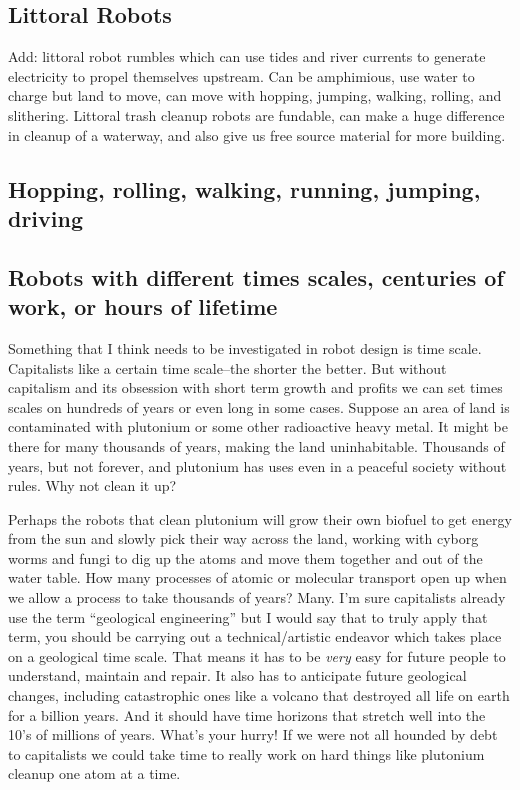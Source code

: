 \subsection{Littoral Robots}\label{littoral-robots}

Add: littoral robot rumbles which can use tides and river currents to
generate electricity to propel themselves upstream. Can be amphimious,
use water to charge but land to move, can move with hopping, jumping,
walking, rolling, and slithering. Littoral trash cleanup robots are
fundable, can make a huge difference in cleanup of a waterway, and also
give us free source material for more building.

\subsection{Hopping, rolling, walking, running, jumping,
driving}\label{hopping-rolling-walking-running-jumping-driving}

\subsection{Robots with different times scales, centuries of work, or
hours of
lifetime}\label{robots-with-different-times-scales-centuries-of-work-or-hours-of-lifetime}

Something that I think needs to be investigated in robot design is time
scale. Capitalists like a certain time scale--the shorter the better.
But without capitalism and its obsession with short term growth and
profits we can set times scales on hundreds of years or even long in
some cases. Suppose an area of land is contaminated with plutonium or
some other radioactive heavy metal. It might be there for many thousands
of years, making the land uninhabitable. Thousands of years, but not
forever, and plutonium has uses even in a peaceful society without
rules. Why not clean it up?

Perhaps the robots that clean plutonium will grow their own biofuel to
get energy from the sun and slowly pick their way across the land,
working with cyborg worms and fungi to dig up the atoms and move them
together and out of the water table. How many processes of atomic or
molecular transport open up when we allow a process to take thousands of
years? Many. I'm sure capitalists already use the term ``geological
engineering'' but I would say that to truly apply that term, you should
be carrying out a technical/artistic endeavor which takes place on a
geological time scale. That means it has to be \emph{very} easy for
future people to understand, maintain and repair. It also has to
anticipate future geological changes, including catastrophic ones like a
volcano that destroyed all life on earth for a billion years. And it
should have time horizons that stretch well into the 10's of millions of
years. What's your hurry! If we were not all hounded by debt to
capitalists we could take time to really work on hard things like
plutonium cleanup one atom at a time.

